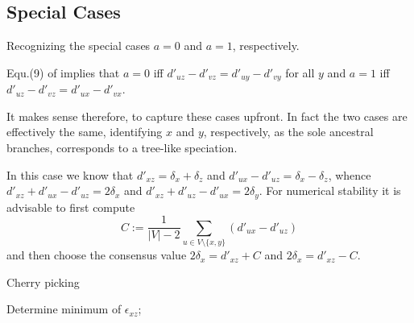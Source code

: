\documentclass{article}
\newcommand{\NR}[1]{\begingroup\color{orange}#1\endgroup}
\begin{document}
\subsection*{Special Cases} 

Recognizing the special cases $a =0$ and $a =1$, respectively.

Equ.(9) of \cite{Prohaska:17a} implies that $a=0$ iff 
$d'_{uz}-d'_{vz} = d'_{uy}-d'_{vy}$ for all $y$ and $a=1$ iff 
$d'_{uz}-d'_{vz} = d'_{ux}-d'_{vx}$.

It makes sense therefore, to capture these cases upfront. In fact the two
cases are effectively the same, identifying $x$ and $y$, respectively, as
the sole ancestral branches, corresponds to a tree-like speciation. 

In this case we know that $d'_{xz}=\delta_x+\delta_z$ and 
$d'_{ux}-d'_{uz}=\delta_x-\delta_z$, whence 
$d'_{xz}+d'_{ux}-d'_{uz}=2\delta_x$
and 
$d'_{xz}+d'_{uz}-d'_{ux}=2\delta_y$. 
For numerical stability it is advisable to first compute 
\begin{equation} 
  C := \frac{1}{|V|-2} \sum_{u\in V\setminus\{x,y\}} (d'_{ux}-d'_{uz})
\end{equation} 
and then choose the consensus value $2\delta_x = d'_{xz}+C$ and 
$2\delta_x = d'_{xz}-C$.



\begin{algorithm}[H]
\caption{\NR{Cherry picking}}
\label{alg:cherries}
 \SetAlgoLined
 Determine minimum of $\epsilon_{xz}$;
\end{algorithm}





      
   
\end{document}
